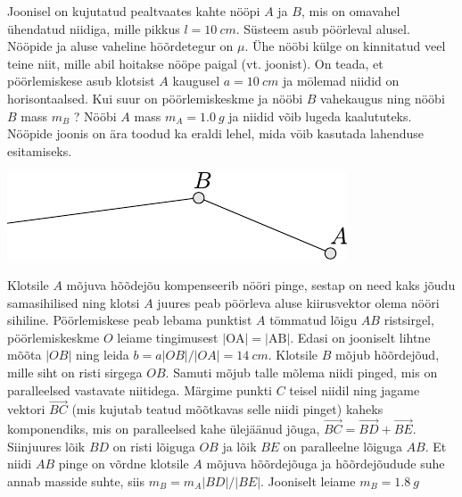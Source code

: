 
Joonisel on kujutatud pealtvaates kahte nööpi $A$ ja $B$, mis on omavahel ühendatud niidiga, mille pikkus $l=\SI{10}{cm}$. Süsteem asub pöörleval alusel. Nööpide ja aluse vaheline hōõrdetegur on $\mu$. Ühe nööbi külge on kinnitatud veel teine niit, mille abil hoitakse nööpe paigal (vt. joonist). On teada, et pöörlemiskese asub klotsist $A$ kaugusel $a=\SI{10}{cm}$ ja mōlemad niidid on horisontaalsed. Kui suur on pöörlemiskeskme ja nööbi $B$ vahekaugus ning nööbi $B$ mass $m_{B}$ ? Nööbi $A$ mass $m_{A}=\SI{1,0}{g}$ ja niidid võib lugeda kaalututeks. Nööpide joonis on ära toodud ka eraldi lehel, mida vōib kasutada lahenduse esitamiseks.
\begin{center}
	\includegraphics[width=0.8\linewidth]{2004-v3g-08-yl.pdf}
\end{center}

\hint

\solu
Klotsile $A$ mõjuva hõõdejõu kompenseerib nööri pinge, sestap on need kaks jõudu samasihilised ning klotsi $A$ juures peab pöörleva aluse kiirusvektor olema nööri sihiline. Pöörlemiskese peab lebama punktist $A$ tōmmatud lõigu $A B$ ristsirgel, pöörlemiskeskme $O$ leiame tingimusest $|\mathrm{OA}|=|\mathrm{AB}|$. Edasi on jooniselt lihtne mõõta $|OB|$ ning leida $b=a|O B| /|O A|=\SI{14}{cm}$. Klotsile $B$ mõjub hõõrdejõud, mille siht on risti sirgega $O B$. Samuti mõjub talle mõlema niidi pinged, mis on paralleelsed vastavate niitidega. Märgime punkti $C$ teisel niidil ning jagame vektori $\overrightarrow{B C}$ (mis kujutab teatud mõõtkavas selle niidi pinget) kaheks komponendiks, mis on paralleelsed kahe ülejäänud jõuga, $\overrightarrow{B C}=\overrightarrow{B D}+\overrightarrow{B E}$. Siinjuures lõik $B D$ on risti lõiguga $O B$ ja lõik $B E$ on paralleelne lõiguga $A B$. Et niidi $A B$ pinge on võrdne klotsile $A$ mõjuva hõõrdejõuga ja hõõrdejõudude suhe annab masside suhte, siis $m_{B}=m_{A}|B D| /|B E| .$ Jooniselt leiame $m_{B}=\SI{1,8}{g}$
\probend